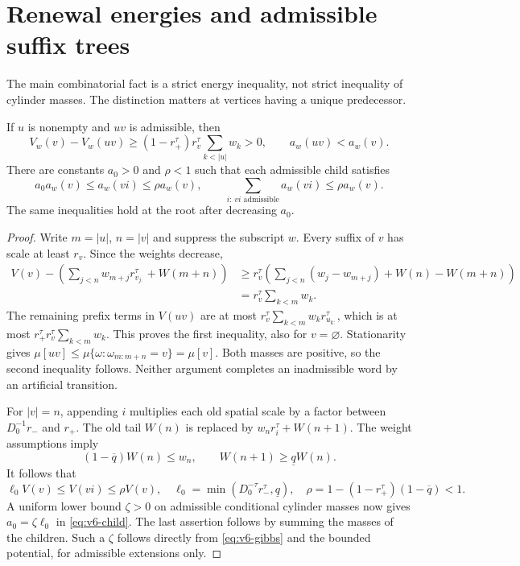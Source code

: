\section{Renewal energies and admissible suffix trees}\label{sec:v6-suffix}
The main combinatorial fact is a strict energy inequality, not strict
inequality of cylinder masses. The distinction matters at vertices
having a unique predecessor.

\begin{lemma}\label{lem:v6-suffix-energy}
If $u$ is nonempty and $uv$ is admissible, then
\begin{equation}
 V_w(v)-V_w(uv)\ge
 (1-r_+^\tau)r_v^\tau\sum_{k<|u|}w_k>0,
 \qquad a_w(uv)<a_w(v).                                  \label{eq:v6-strict}
\end{equation}
There are constants $a_0>0$ and $\rho<1$ such that each admissible child
satisfies
\begin{equation}
 a_0a_w(v)\le a_w(vi)\le\rho a_w(v),\qquad
 \sum_{i:\,vi\text{ admissible}}a_w(vi)\le\rho a_w(v).
                                                        \label{eq:v6-child}
\end{equation}
The same inequalities hold at the root after decreasing $a_0$.
\end{lemma}
\begin{proof}
Write $m=|u|$, $n=|v|$ and suppress the subscript $w$. Every suffix of
$v$ has scale at least $r_v$. Since the weights decrease,
\begin{align*}
 V(v)-\left(\sum_{j<n}w_{m+j}r_{v_{j:}}^\tau+W(m+n)\right)
 &\ge r_v^\tau\left(\sum_{j<n}(w_j-w_{m+j})+W(n)-W(m+n)\right)\\
 &=r_v^\tau\sum_{k<m}w_k.
\end{align*}
The remaining prefix terms in $V(uv)$ are at most
$r_v^\tau\sum_{k<m}w_kr_{u_{k:}}^\tau$, which is at most
$r_+^\tau r_v^\tau\sum_{k<m}w_k$. This proves the first inequality,
also for $v=\varnothing$. Stationarity gives
$\mu[uv]\le\mu\{\omega:\omega_{m:m+n}=v\}=\mu[v]$.
Both masses are positive, so the second inequality follows. Neither
argument completes an inadmissible word by an artificial transition.

For $|v|=n$, appending $i$ multiplies each old spatial scale by a
factor between $D_0^{-1}r_-$ and $r_+$. The old tail $W(n)$ is replaced
by $w_nr_i^\tau+W(n+1)$. The weight assumptions imply
\[
 (1-\overline q)W(n)\le w_n,\qquad
 W(n+1)\ge\underline q W(n).
\]
It follows that
\[
 \ell_0 V(v)\le V(vi)\le\rho V(v),\quad
 \ell_0=\min(D_0^{-\tau}r_-^\tau,\underline q),\quad
 \rho=1-(1-r_+^\tau)(1-\overline q)<1.
\]
A uniform lower bound $\zeta>0$ on admissible conditional cylinder
masses now gives $a_0=\zeta\ell_0$ in \eqref{eq:v6-child}.
The last assertion follows by summing the masses of the children.
Such a $\zeta$ follows directly from \eqref{eq:v6-gibbs} and the
bounded potential, for admissible extensions only.
\end{proof}

